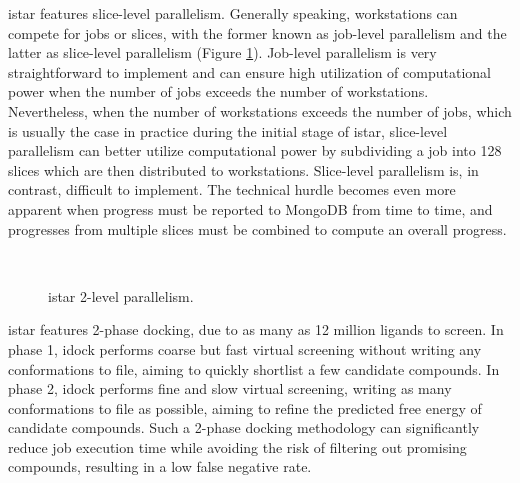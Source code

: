 istar features slice-level parallelism. Generally speaking, workstations can compete for jobs or slices, with the former known as job-level parallelism and the latter as slice-level parallelism (Figure \ref{istar:2LevelParallelism}). Job-level parallelism is very straightforward to implement and can ensure high utilization of computational power when the number of jobs exceeds the number of workstations. Nevertheless, when the number of workstations exceeds the number of jobs, which is usually the case in practice during the initial stage of istar, slice-level parallelism can better utilize computational power by subdividing a job into 128 slices which are then distributed to workstations. Slice-level parallelism is, in contrast, difficult to implement. The technical hurdle becomes even more apparent when progress must be reported to MongoDB from time to time, and progresses from multiple slices must be combined to compute an overall progress.

\begin{figure}
\centering
{}
\\
\caption{istar 2-level parallelism.}
\label{istar:2LevelParallelism}
\end{figure}

istar features 2-phase docking, due to as many as 12 million ligands to screen. In phase 1, idock performs coarse but fast virtual screening without writing any conformations to file, aiming to quickly shortlist a few candidate compounds. In phase 2, idock performs fine and slow virtual screening, writing as many conformations to file as possible, aiming to refine the predicted free energy of candidate compounds. Such a 2-phase docking methodology can significantly reduce job execution time while avoiding the risk of filtering out promising compounds, resulting in a low false negative rate.

